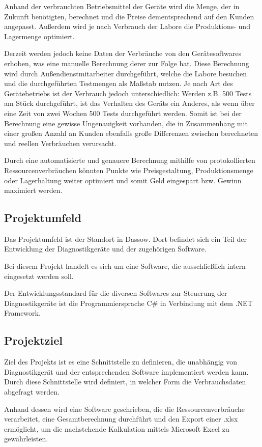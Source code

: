 Anhand der verbrauchten Betriebsmittel der Geräte wird die Menge, der in Zukunft benötigten, berechnet und die Preise dementsprechend auf den Kunden angepasst. Außerdem wird je nach Verbrauch der Labore die Produktions- und Lagermenge optimiert.

Derzeit werden jedoch keine Daten der Verbräuche von den Gerätesoftwares erhoben, was eine manuelle Berechnung derer zur Folge hat. Diese Berechnung wird durch Außendienstmitarbeiter durchgeführt, welche die Labore besuchen und die durchgeführten Testmengen als Maßstab nutzen. Je nach Art des Gerätebetriebs ist der Verbrauch jedoch unterschiedlich: Werden z.B. 500 Tests am Stück durchgeführt, ist das Verhalten des Geräts ein Anderes, als wenn über eine Zeit von zwei Wochen 500 Tests durchgeführt werden. Somit ist bei der Berechnung eine gewisse Ungenauigkeit vorhanden, die in Zusammenhang mit einer großen Anzahl an Kunden ebenfalls große Differenzen zwischen berechneten und reellen Verbräuchen verursacht. 

Durch eine automatisierte und genauere Berechnung mithilfe von protokollierten Ressourcenverbräuchen könnten Punkte wie Preisgestaltung, Produktionsmenge oder Lagerhaltung weiter optimiert und somit Geld eingespart bzw. Gewinn maximiert werden.

\subsection{Projektumfeld}
\label{sec:Projektumfeld}
Das Projektumfeld ist der {\betriebNameKzf} Standort in Dassow. Dort befindet sich ein Teil der Entwicklung der Diagnostikgeräte und der zugehörigen Software. 

Bei diesem Projekt handelt es sich um eine Software, die ausschließlich intern eingesetzt werden soll.

Der Entwicklungsstandard für die diversen Softwares zur Steuerung der Diagnostikgeräte ist die Programmiersprache C\# in Verbindung mit dem .NET Framework.

\subsection{Projektziel}
\label{sec:Projektziel}
Ziel des Projekts ist es eine Schnittstelle zu definieren, die unabhängig von Diagnostikgerät und der entsprechenden Software implementiert werden kann. Durch diese Schnittstelle wird definiert, in welcher Form die Verbrauchsdaten abgefragt werden.

Anhand dessen wird eine Software geschrieben, die die Ressourcenverbräuche verarbeitet, eine Gesamtberechnung durchführt und den Export einer \glqq .xlsx\grqq \xspace ermöglicht, um die nachstehende Kalkulation mittels Microsoft Excel zu gewährleisten.

